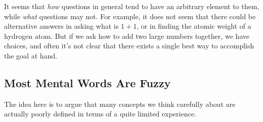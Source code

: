 \documentclass[11pt, oneside]{article}   	%
\begin{document}
It seems that {\em how} questions in general tend to have an arbitrary element
to them, while {\em what} questions may not. For example, it does not seem that
there could be alternative answers in asking what is $1+1$, or in finding the
atomic weight of a hydrogen atom. But if we ask how to add two large numbers
together, we have choices, and often it's not clear that there exists a single
best way to accomplish the goal at hand.

\subsection{Most Mental Words Are Fuzzy}

The idea here is to argue that many concepts we think carefully about are
actually poorly defined in terms of a quite limited experience.


%
%
%
%





%

\end{document}
